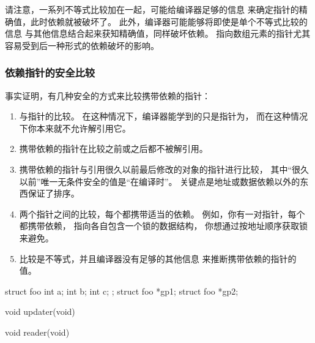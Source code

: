 请注意，一系列不等式比较加在一起，可能给编译器足够的信息
来确定指针的精确值，此时依赖就被破坏了。
此外，编译器可能能够将即使是单个不等式比较的信息
与其他信息结合起来获知精确值，同样破坏依赖。
指向数组元素的指针尤其容易受到后一种形式的依赖破坏的影响。

\subsubsection{依赖指针的安全比较}
事实证明，有几种安全的方式来比较携带依赖的指针：

\begin{enumerate}
\item	与指针的比较。
	在这种情况下，编译器能学到的只是指针为，
	而在这种情况下你本来就不允许解引用它。
\item	携带依赖的指针在比较之前或之后都不被解引用。
\item	携带依赖的指针与引用很久以前最后修改的对象的指针进行比较，
	其中``很久以前''唯一无条件安全的值是``在编译时''。
	关键点是地址或数据依赖以外的东西保证了排序。
\item	两个指针之间的比较，每个都携带适当的依赖。
	例如，你有一对指针，每个都携带依赖，
	指向各自包含一个锁的数据结构，
	你想通过按地址顺序获取锁来避免。
\item	比较是不等式，并且编译器没有足够的其他信息
	来推断携带依赖的指针的值。
\end{enumerate}

\begin{listing}
\begin{fcvlabel}
\begin{VerbatimL}[commandchars=\\\[\]]
struct foo {		\lnlbl[foo:b]
	int a;
	int b;
	int c;
};                      \lnlbl[foo:e]
struct foo *gp1;	\lnlbl[gp1]
struct foo *gp2;	\lnlbl[gp2]

void updater(void)						\lnlbl[upd:e]

void reader(void)						\lnlbl[read:e]
\end{VerbatimL}
\end{fcvlabel}
\caption{被指针比较破坏的Dependencies}
\label{lst:memorder:Broken Dependencies With Pointer Comparisons}
\end{listing}

